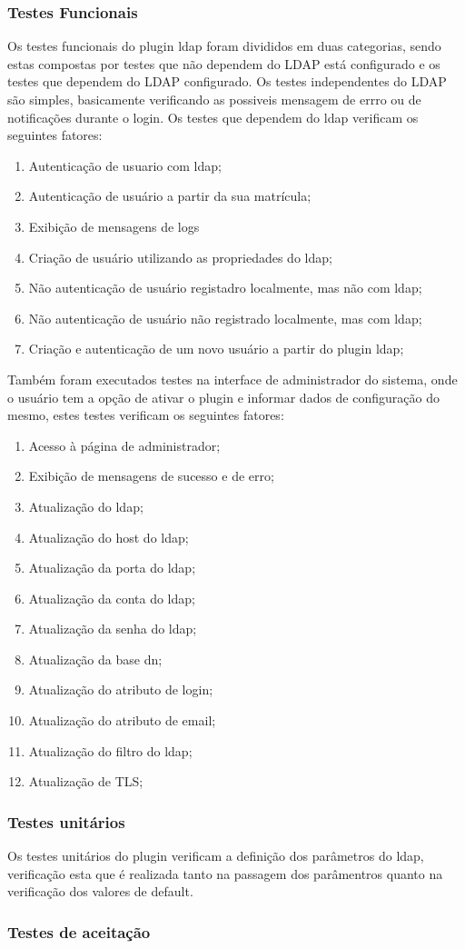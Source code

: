 \subsubsection{Testes Funcionais}
%
Os testes funcionais do plugin ldap foram divididos em duas categorias, sendo estas compostas por testes que não dependem do LDAP está configurado e os testes que dependem do LDAP configurado. Os testes independentes do LDAP são simples, basicamente verificando as possiveis mensagem de errro ou de notificações durante o login. Os testes  que dependem do ldap verificam os seguintes fatores:
%
\begin{enumerate}
\item Autenticação de usuario com ldap;
\item Autenticação de usuário a partir da sua matrícula;
\item Exibição de mensagens de logs
\item Criação de usuário utilizando as propriedades do ldap;
\item Não autenticação de usuário registadro localmente, mas não com ldap;
\item Não autenticação de usuário não registrado localmente, mas com ldap;
\item Criação e autenticação de um novo usuário a partir do plugin ldap;
\end{enumerate}
%
Também foram executados testes na interface de administrador do sistema, onde o usuário tem a opção de ativar o plugin e informar dados de configuração do mesmo, estes testes verificam os seguintes fatores:
%
\begin{enumerate}
\item Acesso à página de administrador;
\item Exibição de mensagens de sucesso e de erro;
\item Atualização do ldap;
\item Atualização do host do ldap;
\item Atualização da porta do ldap;
\item Atualização da conta do ldap;
\item Atualização da senha do ldap;
\item Atualização da base dn;
\item Atualização do atributo de login;
\item Atualização do atributo de email;
\item Atualização do filtro do ldap;
\item Atualização de TLS;
\end{enumerate}


\subsubsection{Testes unitários}
%
Os testes unitários do plugin verificam a definição dos parâmetros do ldap, verificação esta que é realizada tanto na passagem dos parâmentros quanto na verificação dos valores de default.
\subsubsection{Testes de aceitação}